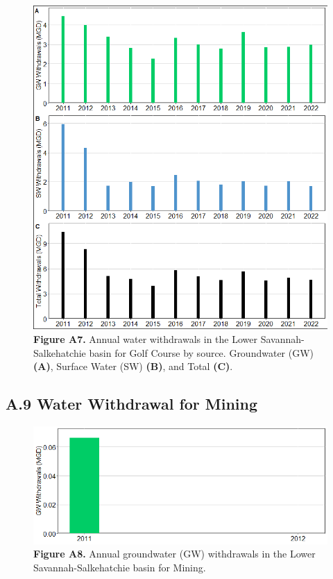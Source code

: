 \documentclass[
]{article}
\begin{document}
\begin{figure}[H]

{\centering \includegraphics{LSS_figures/trend-GC_bar-plot-1} 

}

\caption{\textbf{Figure A7.} Annual water withdrawals in the Lower Savannah-Salkehatchie basin for Golf Course by source. Groundwater (GW) \textbf{(A)}, Surface Water (SW) \textbf{(B)}, and Total \textbf {(C)}.}\label{fig:trend-GC_bar-plot}
\end{figure}

\hypertarget{a.9-water-withdrawal-for-mining}{%
\subsection{A.9 Water Withdrawal for
Mining}\label{a.9-water-withdrawal-for-mining}}

\begin{figure}[H]

{\centering \includegraphics{LSS_figures/trend-MI_bar-plot-1} 

}

\caption{\textbf{Figure A8.} Annual groundwater (GW) withdrawals in the Lower Savannah-Salkehatchie basin for Mining.}\label{fig:trend-MI_bar-plot}
\end{figure}
\end{document}
